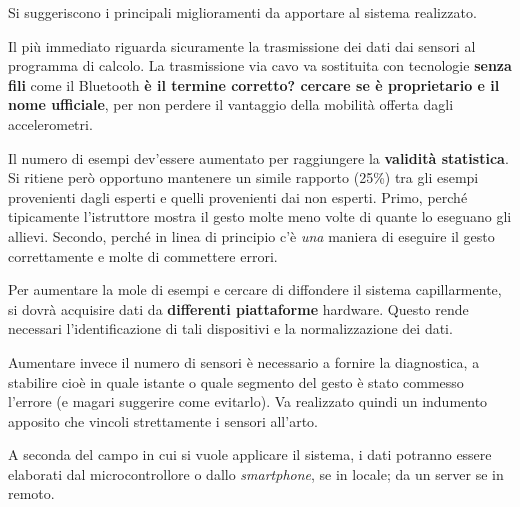 Si suggeriscono i principali miglioramenti da apportare al sistema realizzato.

Il più immediato riguarda sicuramente la trasmissione dei dati
dai sensori al programma di calcolo.
La trasmissione via cavo va sostituita con tecnologie \textbf{senza fili}
come il Bluetooth
\textbf{è il termine corretto? cercare se è proprietario e il nome ufficiale},
per non perdere il vantaggio della mobilità offerta dagli accelerometri.

Il numero di esempi dev'essere aumentato per raggiungere la \textbf{validità statistica}.
Si ritiene però opportuno mantenere un simile rapporto (25\%)
tra gli esempi provenienti dagli esperti e quelli provenienti dai non esperti.
Primo, perché tipicamente l'istruttore mostra il gesto
molte meno volte di quante lo eseguano gli allievi.
Secondo, perché in linea di principio
c'è \emph{una} maniera di eseguire il gesto correttamente
e molte di commettere errori.

Per aumentare la mole di esempi e cercare di diffondere il sistema capillarmente,
si dovrà acquisire dati da \textbf{differenti piattaforme} hardware.
Questo rende necessari l'identificazione di tali dispositivi
e la normalizzazione dei dati.

Aumentare invece il numero di sensori è necessario a fornire la diagnostica,
a stabilire cioè in quale istante o quale segmento del gesto è stato commesso l'errore
(e magari suggerire come evitarlo).
Va realizzato quindi un indumento apposito che vincoli strettamente i sensori all'arto.

A seconda del campo in cui si vuole applicare il sistema,
i dati potranno essere elaborati dal microcontrollore o dallo \textit{smartphone},
se in locale; da un server se in remoto.
